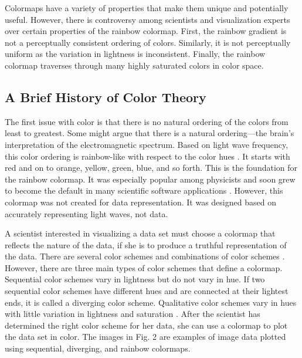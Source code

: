 \documentclass[journal]{IEEEtran}
\begin{document}
Colormaps have a variety of properties that make them unique and potentially useful. However, there is controversy among scientists and visualization experts over certain properties of the rainbow colormap. First, the rainbow gradient is not a perceptually consistent ordering of colors. Similarly, it is not perceptually uniform as the variation in lightness is inconsistent. Finally, the rainbow colormap traverses through many highly saturated colors in color space.
\par

\subsection{A Brief History of Color Theory}

The first issue with color is that there is no natural ordering of the colors
from least to greatest. Some might argue that there is a natural
ordering---the brain's interpretation of the electromagnetic spectrum.
Based on light wave frequency, this color ordering is rainbow-like with respect
to the color hues \cite{colormapping}. It starts with red and on to orange,
yellow, green, blue, and so forth. This is the foundation for the rainbow colormap.
It was especially popular among physicists and soon grew to become the default
in many scientific software applications \cite{rainbowstill,matlab}. However,
this colormap was not created for data representation. It was designed based
on accurately representing light waves, not data.
\par
A scientist interested in visualizing a data set must
choose a colormap that reflects the nature of the data, if she is to produce
a truthful representation of the data.
There are several color schemes and combinations of
color schemes \cite{colorguidelines}. However, there are
three main types of color schemes that define a colormap.
Sequential color schemes vary in lightness but do not
vary in hue. If two sequential color schemes have different hues and are
connected at their lightest ends, it is called a diverging color scheme. Qualitative color
schemes vary in hues with little variation in lightness
and saturation \cite{colormapping}. After the scientist has
determined the right color scheme for her data, she can
use a colormap to plot the data set in color.
The images in Fig. 2 are examples of image data plotted using
sequential, diverging, and rainbow colormaps.

\par
\end{document}
